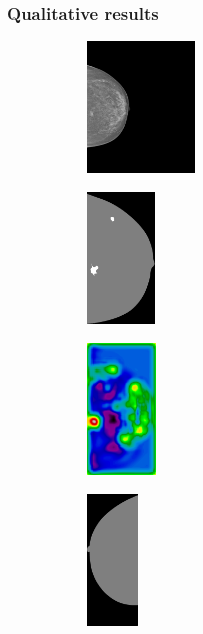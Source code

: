 \documentclass{beamer}
\begin{document}
	\begin{frame}
		\frametitle{Qualitative results}
		\begin{figure}[h]
		\centering
			\begin{subfigure}{0.25\textwidth}
				\centering
					\includegraphics[height=3.5cm]{plots/mammogram_ex1.png}
			\end{subfigure}
			\begin{subfigure}{0.16\textwidth}
				\centering
					\includegraphics[height=3.5cm]{plots/label_ex1.png}
			\end{subfigure}
			\begin{subfigure}{0.17\textwidth}
				\centering
					\includegraphics[height=3.5cm]{plots/logits_ex1_v3.png}
			\end{subfigure}
			\begin{subfigure}{0.22\textwidth}
				\centering
					\includegraphics[height=3.5cm]{plots/segmentation_ex1_v3.png}
			\end{subfigure}%
			\\
			\begin{subfigure}{0.25\textwidth}

\end{subfigure}
\end{figure}
\end{frame}
\end{document}

